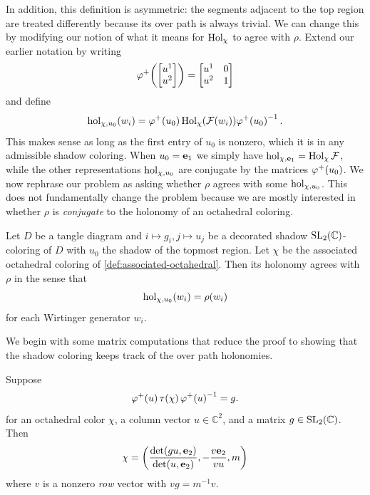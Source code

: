 \documentclass[leqno]{sl2art}
\begin{document}
In addition, this definition is asymmetric: the segments adjacent to the top region are treated differently because its over path is always trivial.
We can change this by modifying our notion of what it means for \(\operatorname{Hol}_{\chi}\) to agree with \(\rho\).
Extend our earlier notation by writing
\[
  \varphi^+\mathopen{}\left(
    \begin{bmatrix}
      u^1 \\ u^2
    \end{bmatrix}
  \right)
  =
  \begin{bmatrix}
    u^{1} & 0 \\
    u^{2} & 1
  \end{bmatrix}
\]
and define
\[
  \operatorname{hol}_{\chi, u_0}(w_i) = \varphi^+\mathopen{}\left(u_0\right) \operatorname{Hol}_{\chi}(\mathcal{F}(w_i)) \varphi^+\mathopen{}\left(u_0\right)^{-1}.
\]
This makes sense as long as the first entry of \(u_0\) is nonzero, which it is in any admissible shadow coloring.
When \(u_0 = \mathrm{\mathbf{e}}_{1}\) we simply have \(\operatorname{hol}_{\chi, \mathrm{\mathbf{e}}_{1}} = \operatorname{Hol}_{\chi} \mathcal{F} \), while the other representations \(\operatorname{hol}_{\chi, u_0}\) are conjugate by the matrices \(\varphi^+\mathopen{}\left(u_0\right)\).
We now rephrase our problem as asking whether \(\rho\) agrees with some \(\operatorname{hol}_{\chi, u_0}\).
This does not fundamentally change the problem because we are mostly interested in whether \(\rho\) is \emph{conjugate} to the holonomy of an octahedral coloring.

\begin{bigtheorem}
  \label{thm:holonomies-match}
  Let \(D\) be a tangle diagram and \(i \mapsto g_i, j \mapsto u_j\) be a decorated shadow \(\operatorname{SL}_2(\mathbb{C})\)-coloring of \(D\) with \(u_0\) the shadow of the topmost region.
  Let \(\chi\) be the associated octahedral coloring of \cref{def:associated-octahedral}.
  Then its holonomy agrees with \(\rho\) in the sense that
  \[
    \operatorname{hol}_{\chi, u_0}(w_i) = \rho(w_i)
  \]
  for each Wirtinger generator \(w_i\).
\end{bigtheorem}

We begin with some matrix computations that reduce the proof to showing that the shadow coloring keeps track of the over path holonomies.
\begin{lemma}
  \label{thm:shadow-lemma}
  Suppose 
  \[
    \varphi^+\mathopen{}\left(u\right) \tau\mathopen{}\left(\chi\right) \varphi^+\mathopen{}\left(u\right)^{-1} = g.
  \]
  for an octahedral color \(\chi\), a column vector \(u \in \mathbb{C}^{2}\), and a matrix \(g \in \operatorname{SL}_2(\mathbb{C})\).
  Then
  \begin{equation*}
    \chi =
    \left(
      \frac{
        \det( g u , \mathrm{\mathbf{e}}_{2} )
      }{
        \det( u , \mathrm{\mathbf{e}}_{2} )
      }
      ,
      -
      \frac{
        v \mathrm{\mathbf{e}}_{2}
      }{
        v u
      }
      ,
      m
    \right)
  \end{equation*}
  where \(v\) is a nonzero \emph{row} vector with \(vg = m^{-1} v\).
\end{lemma}
\end{document}
